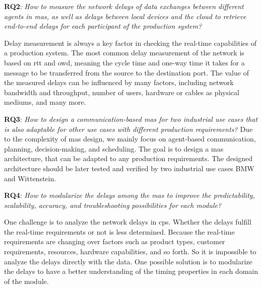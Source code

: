 \textbf{RQ2}: \textit{How to measure the network delays of data exchanges between 
different agents in \gls{mas}, as well as delays between local devices and the cloud 
to retrieve end-to-end delays for each participant of the production system?}

Delay measurement is always a key factor in checking the real-time capabilities of a 
production system. The most common delay measurement of the network is based on 
\gls{rtt} and \gls{owd}, meaning the cycle time and one-way time it takes for 
a message to be transferred 
from the source to the destination port\cite{paxson_end--end_1999}. The value of the measured delays can be influenced by 
many factors, including network bandwidth and throughput, number of users, hardware 
or cables as physical mediums, and many more\cite{neokosmidis_roadmap_2017}. 



\textbf{RQ3}: \textit{How to design a communication-based \gls{mas} for two industrial use 
cases that is also adaptable for other use cases with different production 
requirements?}
Due to the complexity of \gls{mas} design, we mainly focus on agent-based communication, 
planning, decision-making, and scheduling. The goal is to design a \gls{mas} architecture, 
that can be adapted to any production requirements. The designed architecture should 
be later tested and verified by two industrial use cases BMW and Wittenstein. 

\textbf{RQ4}: \textit{How to modularize the delays among the \gls{mas} to improve the 
predictability, scalability, accuracy, and troubleshooting possibilities for 
each module?}  

One challenge is to analyze the network delays in \gls{cps}. Whether the delays fulfill 
the real-time requirements or not is less determined\cite{forouzan2004data}. Because the real-time requirements 
are changing over factors such as product types, customer requirements, resources, hardware 
capabilities, and so forth. So it is impossible to analyze the delays directly with 
the data. One possible solution is to modularize the delays to have a better understanding 
of the timing properties in each domain of the module\cite{blecker_modularity_2006}. 




